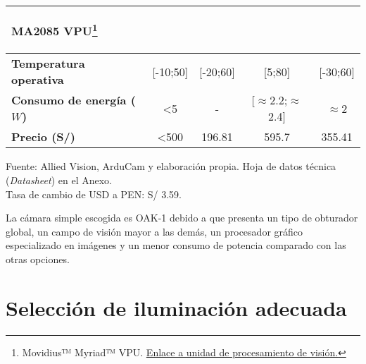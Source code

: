 \begin{savenotes}
\begin{mytable}[H]
\begin{tabular}{l|c|c|c|c|}
			\begin{minipage}{\mythirdmaxsizeofcontenttable}\begin{myflushcenterinsidetable}
				MA2085 VPU\footnote{Movidius™ Myriad™ VPU. \href{https://www.intel.com/content/www/us/en/products/processors/movidius-vpu/movidius-myriad-x.html}{Enlace a unidad de procesamiento de visión.}}
			\end{myflushcenterinsidetable}\end{minipage}  \\ \hline 
			\multicolumn{1}{|l|}{
			\begin{minipage}{\myforthmaxsizeofcontenttable}	
				\textbf{Temperatura operativa}
			\end{minipage}
			} & [-10;50] & [-20;60] & [5;80] & 
         [-30;60]
         \\ \hline
			\multicolumn{1}{|l|}{
			\begin{minipage}{\myforthmaxsizeofcontenttable}	
				\textbf{Consumo de energía ($W$)}
			\end{minipage}
			} & <5 & - & [$\approx$2.2;$\approx$2.4] & 
			$\approx$2
			\\ \hline
			\multicolumn{1}{|l|}{
			\begin{minipage}{\myforthmaxsizeofcontenttable}	
				\textbf{Precio (S/)}
			\end{minipage}
			} & <500 & 196.81 & 595.7 & %
			355.41
			\\ \hline
			\end{tabular}
		\begin{myflushcenteraftertable}	
			Fuente: Allied Vision, ArduCam y elaboración propia. Hoja de datos técnica (\textit{Datasheet}) en el Anexo.\\
			Tasa de cambio de USD a PEN: S/ 3.59.
		\end{myflushcenteraftertable}
	\end{mytable}
\end{savenotes}

La cámara simple escogida es OAK-1 debido a que presenta un tipo de obturador global, un campo de visión mayor a las demás, un procesador gráfico especializado en imágenes y un menor consumo de potencia comparado con las otras opciones.

\section{Selección de iluminación adecuada} 

